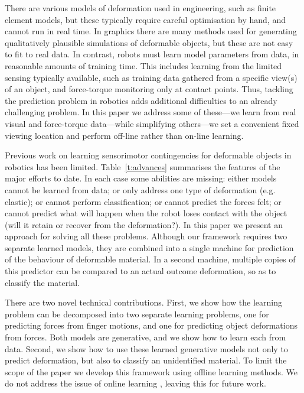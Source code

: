 \documentclass[journal]{IEEEtran}
\begin{document}
There are various models of deformation used in engineering, such as finite element models, but these typically require careful optimisation by hand, and cannot run in real time. In graphics there are many methods used for generating qualitatively plausible simulations of deformable objects, but these are not easy to fit to real data. In contrast, robots must learn model parameters from data, in reasonable amounts of training time. This includes learning from the limited sensing typically available, such as training data gathered from a specific view(s) of an object, and force-torque monitoring only at contact points. Thus, tackling the prediction problem in robotics adds additional difficulties to an already challenging problem. In this paper we address some of these---we learn from real visual and force-torque data---while simplifying others---we set a convenient fixed viewing location and perform off-line rather than on-line learning.


Previous work on learning sensorimotor contingencies for deformable objects in robotics has been limited. Table~\ref{t:advances} summarises the features of the major efforts to date. In each case some abilities are missing: either models cannot be learned from data; or only address one type of deformation (e.g. elastic); or cannot perform classification; or cannot predict the forces felt; or cannot predict what will happen when the robot loses contact with the object (will it retain or recover from the deformation?). In this paper we present an approach for solving all these problems. Although our framework requires two separate learned models, they are combined into a single machine for prediction of the behaviour of deformable material. In a second machine, multiple copies of this predictor can be compared to an actual outcome deformation, so as to classify the material.

There are two novel technical contributions. First, we show how the learning problem can be decomposed into two separate learning problems, one for predicting forces from finger motions, and one for predicting object deformations from forces. Both models are generative, and we show how to learn each from data. Second, we show how to use these learned generative models not only to predict deformation, but also to classify an unidentified material. To limit the scope of the paper we develop this framework using offline learning methods. We do not address the issue of online learning \cite{worgotter09,antonelli14}, leaving this for future work.
\end{document}
